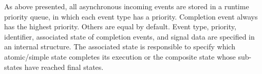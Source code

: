 As above presented, all asynchronous incoming events are stored in a runtime priority queue, in which each event type has a priority. Completion event always has the highest priority. 
Others are equal by default. 
Event type, priority, identifier, associated state  of completion events, and signal data are specified in an internal structure. 
The associated state is responsible to specify which atomic/simple state completes its  execution or the composite state whose sub-states have reached final states. 

